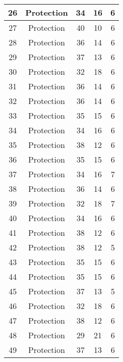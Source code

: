 \documentclass[results.tex]{subfiles}
\begin{document}
\begin{center}
\begin{tabular}{| c || c | c | c | c |}
    \hline
    26 & Protection & 34 & 16 & 6 \\ 
    \hline
    27 & Protection & 40 & 10 & 6 \\ 
    \hline
    28 & Protection & 36 & 14 & 6 \\ 
    \hline
    29 & Protection & 37 & 13 & 6 \\ 
    \hline
    30 & Protection & 32 & 18 & 6 \\ 
    \hline
    31 & Protection & 36 & 14 & 6 \\ 
    \hline
    32 & Protection & 36 & 14 & 6 \\ 
    \hline
    33 & Protection & 35 & 15 & 6 \\ 
    \hline
    34 & Protection & 34 & 16 & 6 \\ 
    \hline
    35 & Protection & 38 & 12 & 6 \\ 
    \hline
    36 & Protection & 35 & 15 & 6 \\ 
    \hline
    37 & Protection & 34 & 16 & 7 \\ 
    \hline
    38 & Protection & 36 & 14 & 6 \\ 
    \hline
    39 & Protection & 32 & 18 & 7 \\ 
    \hline
    40 & Protection & 34 & 16 & 6 \\ 
    \hline
    41 & Protection & 38 & 12 & 6 \\ 
    \hline
    42 & Protection & 38 & 12 & 5 \\ 
    \hline
    43 & Protection & 35 & 15 & 6 \\ 
    \hline
    44 & Protection & 35 & 15 & 6 \\ 
    \hline
    45 & Protection & 37 & 13 & 5 \\ 
    \hline
    46 & Protection & 32 & 18 & 6 \\ 
    \hline
    47 & Protection & 38 & 12 & 6 \\ 
    \hline
    48 & Protection & 29 & 21 & 6 \\ 
    \hline
    49 & Protection & 37 & 13 & 6 \\ 
    \hline   \end{tabular}
\end{center}
\end{document}

